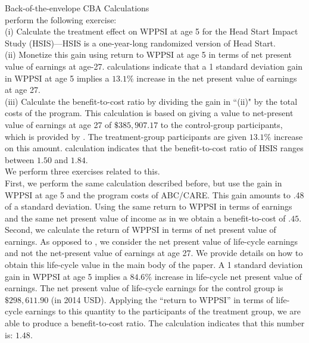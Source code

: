 



\doublespacing

\noindent Back-of-the-envelope CBA Calculations \\

\noindent \citet{Kline-Walters_2016_QJE} perform the following exercise:\\

\noindent (i)  Calculate the treatment effect on WPPSI at age 5 for the Head Start Impact Study (HSIS)---HSIS is a one-year-long randomized version of Head Start.\\

\noindent (ii) Monetize this gain using \citet{Chetty_Friedman_etal_2010_HowDoesYour} return to WPPSI at age 5 in terms of net present value of earnings at age-27. \citet{Chetty_Friedman_etal_2010_HowDoesYour} calculations indicate that a 1 standard deviation gain in WPPSI at age 5 implies a $13.1\%$ increase in the net present value of earnings at age 27.\\

\noindent (iii) Calculate the benefit-to-cost ratio by dividing the gain in ``(ii)" by the total costs of the program. This calculation is based on giving a value to net-present value of earnings at age 27 of $\$385,907.17$ to the control-group participants, which is provided by \citet{Chetty_Friedman_etal_2010_HowDoesYour}. The treatment-group participants are given $13.1\%$ increase on this amount. \citet{Kline-Walters_2016_QJE} calculation indicates that the benefit-to-cost ratio of HSIS ranges between $1.50$ and $1.84$.\\ 

\noindent We perform three exercises related to this.\\

\noindent First, we perform the same calculation described before, but use the gain in WPPSI at age 5 and the program costs of ABC/CARE. This gain amounts to .48 of a standard deviation. Using the same return to WPPSI in terms of earnings and the same net present value of income as in\citet{Chetty_Friedman_etal_2010_HowDoesYour} we obtain a benefit-to-cost of $.45$.\\

\noindent Second, we calculate the return of WPPSI in terms of net present value of earnings. As opposed to  \citet{Chetty_Friedman_etal_2010_HowDoesYour}, we consider the net present value of life-cycle earnings and not the net-present value of earnings at age 27. We provide details on how to obtain this life-cycle value in the main body of the paper. A 1 standard deviation gain in WPPSI at age 5 implies a $84.6\%$ increase in life-cycle net present value of earnings. The net present value of life-cycle earnings for the control group is $\$298,611.90$ (in 2014 USD). Applying the ``return to WPPSI'' in terms of life-cycle earnings to this quantity to the participants of the treatment group, we are able to produce a benefit-to-cost ratio. The calculation indicates that this number is: $1.48$.\\

